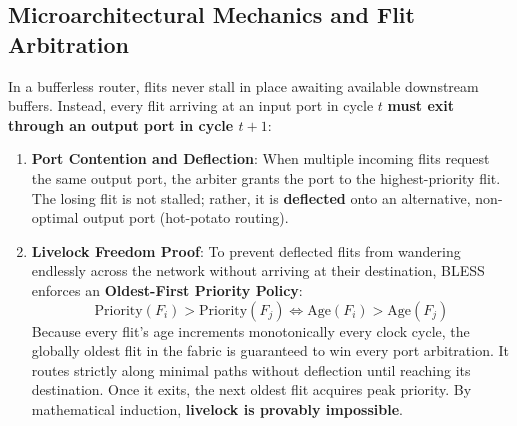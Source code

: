 \subsection{Microarchitectural Mechanics and Flit Arbitration}
In a bufferless router, flits never stall in place awaiting available downstream buffers. Instead, every flit arriving at an input port in cycle $t$ \textbf{must exit through an output port in cycle $t+1$}:
\begin{enumerate}
    \item \textbf{Port Contention and Deflection}: When multiple incoming flits request the same output port, the arbiter grants the port to the highest-priority flit. The losing flit is not stalled; rather, it is \textbf{deflected} onto an alternative, non-optimal output port (hot-potato routing).
    \item \textbf{Livelock Freedom Proof}: To prevent deflected flits from wandering endlessly across the network without arriving at their destination, BLESS enforces an \textbf{Oldest-First Priority Policy}:
    \begin{equation}
    \text{Priority}(F_i) > \text{Priority}(F_j) \iff \text{Age}(F_i) > \text{Age}(F_j)
    \label{eq:ch6_bless_priority}
    \end{equation}
    Because every flit's age increments monotonically every clock cycle, the globally oldest flit in the fabric is guaranteed to win every port arbitration. It routes strictly along minimal paths without deflection until reaching its destination. Once it exits, the next oldest flit acquires peak priority. By mathematical induction, \textbf{livelock is provably impossible}.
\end{enumerate}

